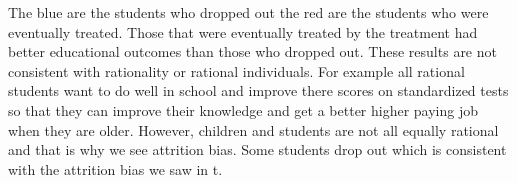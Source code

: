 \documentclass[
  12pt,
  landscape]{article}
\begin{document}
The blue are the students who dropped out the red are the students who
were eventually treated. Those that were eventually treated by the
treatment had better educational outcomes than those who dropped out.
These results are not consistent with rationality or rational
individuals. For example all rational students want to do well in school
and improve there scores on standardized tests so that they can improve
their knowledge and get a better higher paying job when they are older.
However, children and students are not all equally rational and that is
why we see attrition bias. Some students drop out which is consistent
with the attrition bias we saw in t.
\end{document}
